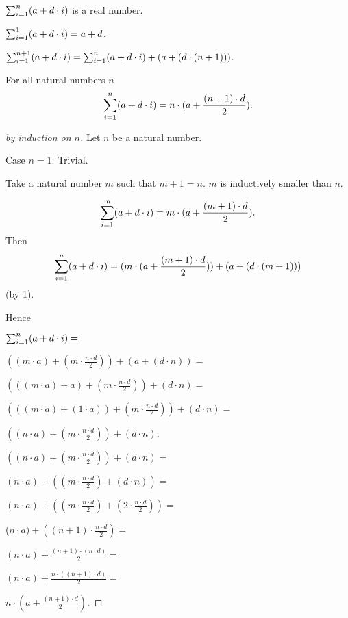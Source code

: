 \documentclass{article}
\begin{document}
\begin{signature}
$\sumarith{a}{d}{n}$ is a real number.
\end{signature}

\begin{axiom}
$\sumarith{a}{d}{1} = a + d$.
\end{axiom}

\begin{axiom}[1]
$\sumarith{a}{d}{n+1} = \sumarith{a}{d}{n} + (a + (d \cdot (n + 1)))$.
\end{axiom}



\begin{theorem} For all natural numbers $n$
$$\sumarith{a}{d}{n} = n \cdot ( a + \frac{(n + 1) \cdot d}{2}).$$
\end{theorem}
\begin{proof}[by induction on $n$]
Let $n$ be a natural number.

Case $n = 1$.
Trivial.

Take a natural number $m$ such that $m + 1 = n$. $m$ is inductively smaller than $n$.

$$\sumarith{a}{d}{m} = m \cdot ( a + \frac{(m + 1) \cdot d}{2}).$$
%
Then
$$\sumarith{a}{d}{n} = 
(m \cdot ( a + \frac{(m + 1) \cdot d}{2})) + (a + (d \cdot (m + 1)))$$
(by 1).

Hence

$\sumarith{a}{d}{n} =$

$((m \cdot a) + (m \cdot \frac{n \cdot d}{2})) + (a + (d \cdot n)) =$

$(((m \cdot a) + a) +  (m \cdot \frac{n \cdot d}{2})) + (d \cdot n) =$

$(((m \cdot a) + (1 \cdot a)) +  (m \cdot \frac{n \cdot d}{2})) + (d \cdot n) =$

$((n \cdot a) +  (m \cdot \frac{n \cdot d}{2})) + (d \cdot n)$.

$((n \cdot a) +  (m \cdot \frac{n \cdot d}{2})) + (d \cdot n) =$

$(n \cdot a) +  ((m \cdot \frac{n \cdot d}{2}) + (d \cdot n)) =$

$(n \cdot a) +  ((m \cdot \frac{n \cdot d}{2}) + (2 \cdot \frac{n \cdot d}{2})) =$

($n \cdot a) +  ((n+1) \cdot \frac{n \cdot d}{2}) =$

$(n \cdot a) +  \frac{(n+1) \cdot (n \cdot d)}{2} =$

$(n \cdot a) +  \frac{n \cdot ((n+1) \cdot d)}{2} =$

$n \cdot ( a + \frac{(n + 1) \cdot d}{2})$.

\end{proof}
\end{document}
